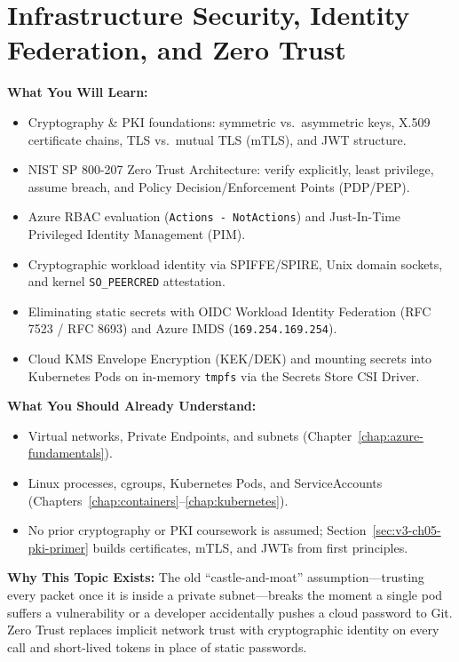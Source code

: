\chapter{Infrastructure Security, Identity Federation, and Zero Trust}
\label{chap:infra-security}

\begin{chaptergoalsbox}
\textbf{What You Will Learn:}
\begin{itemize}[leftmargin=12pt]
  \item Cryptography \& PKI foundations: symmetric vs.\ asymmetric keys, X.509 certificate chains, TLS vs.\ mutual TLS (mTLS), and JWT structure.
  \item NIST SP 800-207 Zero Trust Architecture: verify explicitly, least privilege, assume breach, and Policy Decision/Enforcement Points (PDP/PEP).
  \item Azure RBAC evaluation (\texttt{Actions - NotActions}) and Just-In-Time Privileged Identity Management (PIM).
  \item Cryptographic workload identity via SPIFFE/SPIRE, Unix domain sockets, and kernel \texttt{SO\_PEERCRED} attestation.
  \item Eliminating static secrets with OIDC Workload Identity Federation (RFC 7523 / RFC 8693) and Azure IMDS (\texttt{169.254.169.254}).
  \item Cloud KMS Envelope Encryption (KEK/DEK) and mounting secrets into Kubernetes Pods on in-memory \texttt{tmpfs} via the Secrets Store CSI Driver.
\end{itemize}

\textbf{What You Should Already Understand:}
\begin{itemize}[leftmargin=12pt]
  \item Virtual networks, Private Endpoints, and subnets (Chapter~\ref{chap:azure-fundamentals}).
  \item Linux processes, cgroups, Kubernetes Pods, and ServiceAccounts (Chapters~\ref{chap:containers}--\ref{chap:kubernetes}).
  \item No prior cryptography or PKI coursework is assumed; Section~\ref{sec:v3-ch05-pki-primer} builds certificates, mTLS, and JWTs from first principles.
\end{itemize}

\textbf{Why This Topic Exists:}
The old ``castle-and-moat'' assumption—trusting every packet once it is inside a private subnet—breaks the moment a single pod suffers a vulnerability or a developer accidentally pushes a cloud password to Git. Zero Trust replaces implicit network trust with cryptographic identity on every call and short-lived tokens in place of static passwords.


\end{chaptergoalsbox}
